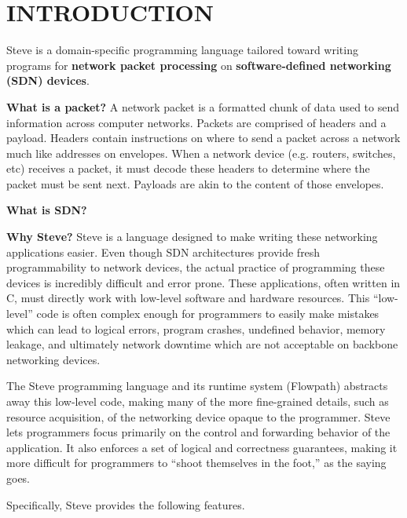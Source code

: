 \chapter{INTRODUCTION} \label{ch:intro}

Steve is a domain-specific programming language tailored toward writing programs for \textbf{network packet processing} on \textbf{software-defined networking (SDN) devices}. 

\textbf{What is a packet?} A network packet is a formatted chunk of data used to send information across computer networks. Packets are comprised of headers and a payload. Headers contain instructions on where to send a packet across a network much like addresses on envelopes. When a network device (e.g. routers, switches, etc) receives a packet, it must decode these headers to determine where the packet must be sent next. Payloads are akin to the content of those envelopes. 

\textbf{What is SDN?} 

\textbf{Why Steve?} Steve is a language designed to make writing these networking applications easier. Even though SDN architectures provide fresh programmability to network devices, the actual practice of programming these devices is incredibly difficult and error prone. These applications, often written in C, must directly work with low-level software and hardware resources. This “low-level” code is often complex enough for programmers to easily make mistakes which can lead to logical errors, program crashes, undefined behavior, memory leakage, and ultimately network downtime which are not acceptable on backbone networking devices.

The Steve programming language and its runtime system (Flowpath) abstracts away this low-level code, making many of the more fine-grained details, such as resource acquisition, of the networking device opaque to the programmer. Steve lets programmers focus primarily on the control and forwarding behavior of the application. It also enforces a set of logical and correctness guarantees, making it more difficult for programmers to “shoot themselves in the foot,” as the saying goes.

Specifically, Steve provides the following features.

